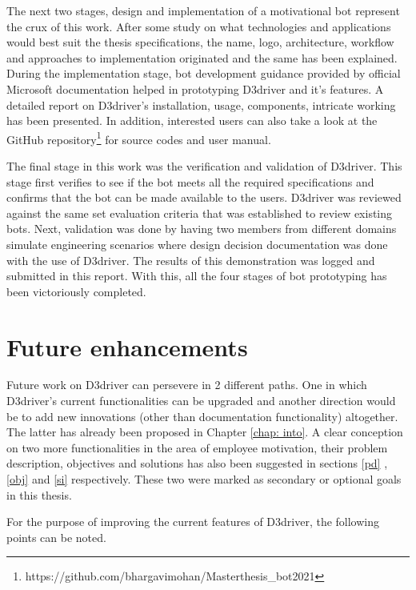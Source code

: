 The next two stages, design and implementation of a motivational bot represent the crux of this work. After some study on what technologies and applications would best suit the thesis specifications, the name, logo, architecture, workflow and approaches to implementation originated and the same has been explained. During the implementation stage, bot development guidance provided by official Microsoft documentation helped in prototyping D3driver and it's features. A detailed report on D3driver's installation, usage, components, intricate working has been presented. In addition, interested users can also take a look at the GitHub repository\footnote{https://github.com/bhargavimohan/Masterthesis\_bot2021} for source codes and user manual.

The final stage in this work was the verification and validation of D3driver. This stage first verifies to see if the bot meets all the required specifications and confirms that the bot can be made available to the users. D3driver was reviewed against the same set evaluation criteria that was established to review existing bots. Next, validation was done by having two members from different domains simulate engineering scenarios where design decision documentation was done with the use of D3driver. The results of this demonstration was logged and submitted in this report. With this, all the four stages of bot prototyping has been victoriously completed.

\section{Future enhancements}

Future work on D3driver can persevere in 2 different paths. One in which D3driver's current functionalities can be upgraded and another direction would be to add new innovations (other than documentation functionality) altogether. The latter has already been proposed in Chapter \ref{chap: into}. A clear conception on two more functionalities in the area of employee motivation, their problem description, objectives and solutions has also been suggested in sections \ref{pd} , \ref{obj} and \ref{si} respectively. These two were marked as secondary or optional goals in this thesis. 


For the purpose of improving the current features of D3driver, the following points can be noted.

